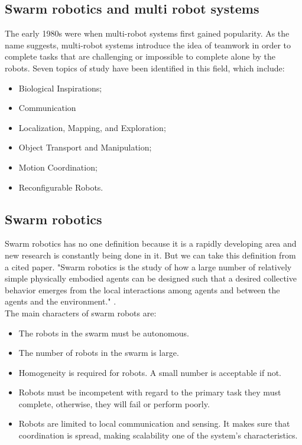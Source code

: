 \documentclass[12pt]{extarticle}
\begin{document}
\subsection{Swarm robotics and multi robot systems}
The early 1980s were when multi-robot systems first gained popularity. As the name suggests, multi-robot systems introduce the idea of teamwork in order to complete tasks that are challenging or impossible to complete alone by the robots. Seven topics of study have been identified in this field, which include: 
\begin{itemize} 
\item Biological Inspirations; 
\item Communication 
\item Localization, Mapping, and Exploration;
\item Object Transport and Manipulation; 
\item Motion Coordination; 
\item Reconfigurable Robots. 
\end{itemize}

 

\subsection{Swarm robotics}
Swarm robotics has no one definition because it is a rapidly developing area and new research is constantly being done in it. But we can take this definition from a cited paper. "Swarm robotics is the study of how a large number of relatively simple physically embodied agents can be designed such that a desired collective behavior emerges from the local interactions among agents and between the agents and the environment." \cite{csahin2005swarm}.\\
The main characters of swarm robots are:
 \begin{itemize} 
\item The robots in the swarm must be autonomous.
\item The number of robots in the swarm is large.
\item Homogeneity is required for robots. A small number is acceptable if not.
\item Robots must be incompetent with regard to the primary task they must complete, otherwise, they will fail or perform poorly.
\item Robots are limited to local communication and sensing. It makes sure that coordination is spread, making scalability one of the system's characteristics. \cite{navarro2013introduction} \end{itemize}
\end{document}
